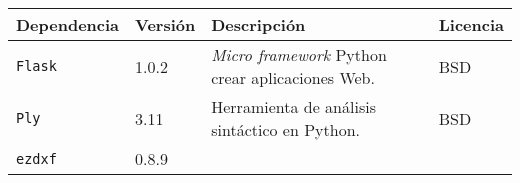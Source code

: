 \begin{longtable}[]{@{}llll@{}}
\toprule
\begin{minipage}[b]{0.18\columnwidth}\raggedright\strut
Dependencia\strut
\end{minipage} & \begin{minipage}[b]{0.10\columnwidth}\raggedright\strut
Versión\strut
\end{minipage} & \begin{minipage}[b]{0.49\columnwidth}\raggedright\strut
Descripción\strut
\end{minipage} & \begin{minipage}[b]{0.11\columnwidth}\raggedright\strut
Licencia\strut
\end{minipage}\tabularnewline
\midrule
\endhead
\begin{minipage}[t]{0.18\columnwidth}\raggedright\strut
\texttt{Flask}\strut
\end{minipage} & \begin{minipage}[t]{0.08\columnwidth}\raggedright\strut
1.0.2\strut
\end{minipage} & \begin{minipage}[t]{0.49\columnwidth}\raggedright\strut
\emph{Micro framework} Python crear aplicaciones Web.\strut
\end{minipage} & \begin{minipage}[t]{0.11\columnwidth}\raggedright\strut
BSD\strut
\end{minipage}\tabularnewline
\begin{minipage}[t]{0.18\columnwidth}\raggedright\strut
\texttt{Ply}\strut
\end{minipage} & \begin{minipage}[t]{0.08\columnwidth}\raggedright\strut
3.11\strut
\end{minipage} & \begin{minipage}[t]{0.49\columnwidth}\raggedright\strut
Herramienta de análisis sintáctico en Python.\strut
\end{minipage} & \begin{minipage}[t]{0.11\columnwidth}\raggedright\strut
BSD\strut
\end{minipage}\tabularnewline
\begin{minipage}[t]{0.18\columnwidth}\raggedright\strut
\texttt{ezdxf} \strut
\end{minipage} & \begin{minipage}[t]{0.08\columnwidth}\raggedright\strut
0.8.9\strut
\end{minipage} & \begin{minipage}[t]{0.49\columnwidth}\raggedright\strut

\end{minipage}
\end{longtable}
